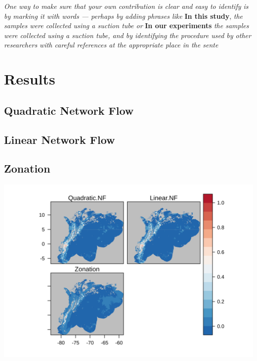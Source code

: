 \documentclass[]{article}
\begin{document}
\emph{One way to make sure that your own contribution is clear and easy
to identify is by marking it with words --- perhaps by adding phrases
like} \textbf{In this study}, \emph{the samples were collected using a suction tube or} \textbf{In
our experiments} \emph{the samples were collected using a suction tube, and by
identifying the procedure used by other researchers with careful references
at the appropriate place in the sente}

\hypertarget{results}{%
\section*{Results}\label{results}}

\hypertarget{quadratic-network-flow-1}{%
\subsection{Quadratic Network Flow}\label{quadratic-network-flow-1}}

\hypertarget{linear-network-flow-1}{%
\subsection{Linear Network Flow}\label{linear-network-flow-1}}

\hypertarget{zonation-1}{%
\subsection{Zonation}\label{zonation-1}}

\includegraphics{NFPaper_files/figure-latex/unnamed-chunk-3-1.png}
\end{document}
